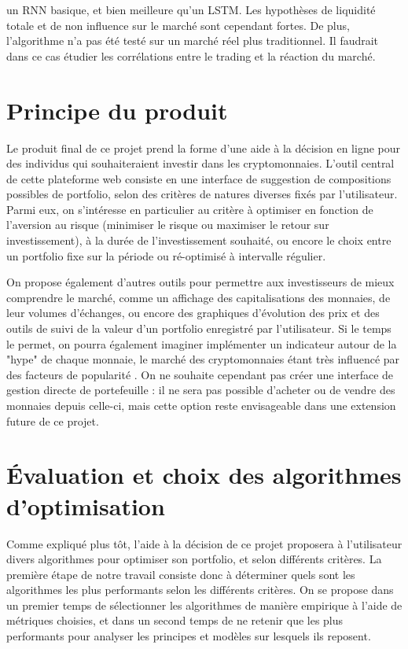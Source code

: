 \documentclass[a4paper, 10pt]{article}
\begin{document}
un RNN basique, et bien meilleure qu'un LSTM. Les hypothèses de liquidité totale et de non influence sur le marché sont cependant fortes. De plus, l'algorithme n'a pas été testé sur un marché réel plus traditionnel. Il faudrait dans ce cas étudier les corrélations entre le trading et la réaction du marché.

\newpage
\section{Principe du produit}

Le produit final de ce projet prend la forme d'une aide à la décision en ligne pour des individus qui souhaiteraient investir dans les cryptomonnaies. L'outil central de cette plateforme web consiste en une interface de suggestion de compositions possibles de portfolio, selon des critères de natures diverses fixés par l'utilisateur. Parmi eux, on s'intéresse en particulier au critère à optimiser en fonction de l'aversion au risque (minimiser le risque ou maximiser le retour sur investissement), à la durée de l'investissement souhaité, ou encore le choix entre un portfolio fixe sur la période ou ré-optimisé à intervalle régulier.

On propose également d'autres outils pour permettre aux investisseurs de mieux comprendre le marché, comme un affichage des capitalisations des monnaies, de leur volumes d'échanges, ou encore des graphiques d'évolution des prix et des outils de suivi de la valeur d'un portfolio enregistré par l'utilisateur. Si le temps le permet, on pourra également imaginer implémenter un indicateur autour de la "hype" de chaque monnaie, le marché des cryptomonnaies étant très influencé par des facteurs de popularité \cite{Colianni2015}. On ne souhaite cependant pas créer une interface de gestion directe de portefeuille : il ne sera pas possible d'acheter ou de vendre des monnaies depuis celle-ci, mais cette option  reste envisageable dans une extension future de ce projet.

\newpage
\section{Évaluation et choix des algorithmes d'optimisation}

Comme expliqué plus tôt, l'aide à la décision de ce projet proposera à l'utilisateur divers algorithmes pour optimiser son portfolio, et selon différents critères. La première étape de notre travail consiste donc à déterminer quels sont les algorithmes les plus performants selon les différents critères. On se propose dans un premier temps de sélectionner les algorithmes de manière empirique à l'aide de métriques choisies, et dans un second temps de ne retenir que les plus performants pour analyser les principes et modèles sur lesquels ils reposent.
\end{document}
